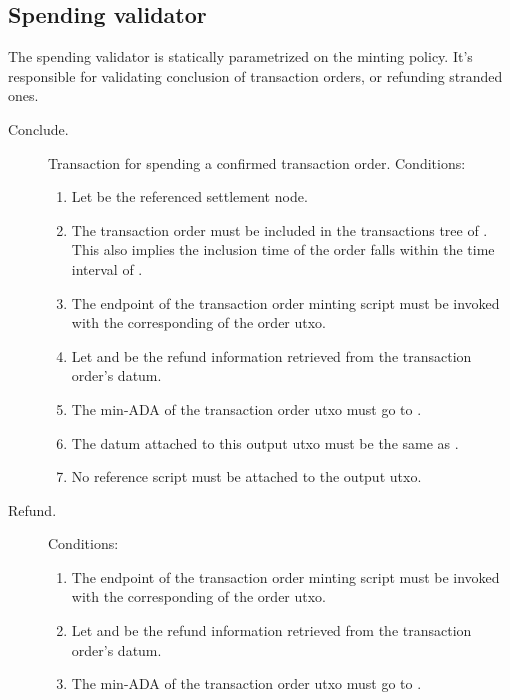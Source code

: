 \documentclass[../midgard.tex]{subfiles}
\begin{document}
\subsection{Spending validator}
\label{h:transaction-order-spending-validator}

The  spending validator is statically parametrized on the  minting policy.
It's responsible for validating conclusion of transaction orders, or refunding stranded ones.

\begin{description}
  \item[Conclude.] Transaction for spending a confirmed transaction order.
    Conditions:
    \begin{enumerate}
      \item Let  be the referenced settlement node.
      \item The transaction order must be included in the transactions tree of .
        This also implies the inclusion time of the order falls within the time interval of .
      \item The  endpoint of the transaction order minting script must be invoked with the corresponding  of the order utxo.
      \item Let  and  be the refund information retrieved from the transaction order's datum.
      \item The min-ADA of the transaction order utxo must go to .
      \item The datum attached to this output utxo must be the same as .
      \item \todo{} No reference script must be attached to the output utxo.
    \end{enumerate}
  \item[Refund.] 
    Conditions:
    \begin{enumerate}
      \item The  endpoint of the transaction order minting script must be invoked with the corresponding  of the order utxo.
      \item Let  and  be the refund information retrieved from the transaction order's datum.
      \item The min-ADA of the transaction order utxo must go to .

\end{enumerate}
\end{description}
\end{document}

